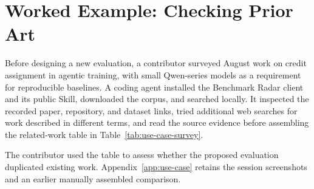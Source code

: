 \documentclass[11pt]{article}
\begin{document}
\section{Worked Example: Checking Prior Art}
\label{sec:worked-example}

Before designing a new evaluation, a contributor surveyed August work on credit assignment in agentic training, with small Qwen-series models as a requirement for reproducible baselines. A coding agent installed the Benchmark Radar client and its public Skill, downloaded the corpus, and searched locally. It inspected the recorded paper, repository, and dataset links, tried additional web searches for work described in different terms, and read the source evidence before assembling the related-work table in Table~\ref{tab:use-case-survey}.

The contributor used the table to assess whether the proposed evaluation duplicated existing work. Appendix~\ref{app:use-case} retains the session screenshots and an earlier manually assembled comparison.
\end{document}
